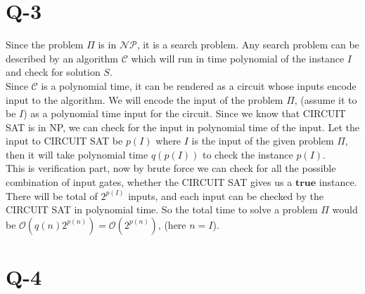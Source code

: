 \documentclass[14pt]{article}
\newcommand{\nonp}{$\mathcal{NP}$}
\begin{document}
	\section*{Q-3}
		\noindent
		Since the problem $\Pi$ is in \nonp, it is a search problem. Any search problem can be described by an algorithm $\mathcal{C}$ which will run in time polynomial of the instance $I$ and check for solution $S$.\\
		\newline
		Since $\mathcal{C}$ is a polynomial time, it can be rendered as a circuit whose inputs encode input to the algorithm. We will encode the input of the problem $\Pi$, (assume it to be $I$) as a polynomial time input for the circuit. Since we know that CIRCUIT SAT is in NP, we can check for the input in polynomial time of the input. Let the input to CIRCUIT SAT be $p(I)$ where $I$ is the input of the given problem $\Pi$, then it will take polynomial time $q(p(I))$ to check the instance $p(I)$.\\
		\newline
		This is verification part, now by brute force we can check for all the possible combination of input gates, whether the CIRCUIT SAT gives us a $\textbf{true}$ instance. There will be total of $2^{p(I)}$ inputs, and each input can be checked by the CIRCUIT SAT in polynomial time. So the total time to solve a problem $\Pi$ would be $\mathcal{O}(q(n)2^{p(n)}) = \mathcal{O}(2^{p(n)})$, (here $n = I$). 
	
	\section*{Q-4}
\end{document}
